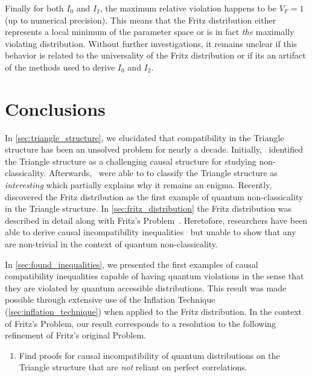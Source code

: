 \documentclass[aps, 10pt, english, twoside, pra, nofootinbib, tightenlines, longbibliography, superscriptaddress]{revtex4-1}
\begin{document}
    Finally for both $I_0$ and $I_2$, the maximum relative violation happens to be $V_F = 1$ (up to numerical precision). This means that the Fritz distribution either represents a local minimum of the parameter space or is in fact \textit{the} maximally violating distribution. Without further investigations, it remains unclear if this behavior is related to the universality of the Fritz distribution or if its an artifact of the methods used to derive $I_0$ and $I_2$.

    \section{Conclusions}
    \label{sec:conclusions}
    In \cref{sec:triangle_structure}, we elucidated that compatibility in the Triangle structure has been an unsolved problem for nearly a decade. Initially,~\citet{Branciard_2012} identified the Triangle structure as a challenging causal structure for studying non-classicality. Afterwards,~\citet{Henson_2014} were able to to classify the Triangle structure as \textit{interesting} which partially explains why it remains an enigma. Recently,~\citet{Fritz_2012} discovered the Fritz distribution as the first example of quantum non-classicality in the Triangle structure. In \cref{sec:fritz_distribution} the Fritz distribution was described in detail along with Fritz's Problem~\cite[Problem 2.17]{Fritz_2012}. Heretofore, researchers have been able to derive causal incompatibility inequalities~\cite{Inflation,Steudel_2010,Henson_2014} but unable to show that any are non-trivial in the context of quantum non-classicality.

    In \cref{sec:found_inequalities}, we presented the first examples of causal compatibility inequalities capable of having quantum violations in the sense that they are violated by quantum accessible distributions. This result was made possible through extensive use of the Inflation Technique (\cref{sec:inflation_technique}) when applied to the Fritz distribution. In the context of Fritz's Problem, our result corresponds to a resolution to the following refinement of Fritz's original Problem.
    \begin{enumerate}[label=\textbf{R.\arabic*}]
        \setcounter{enumi}{0}
        \item \label{r:1} Find proofs for causal incompatibility of quantum distributions on the Triangle structure that are \textit{not} reliant on perfect correlations.
    \end{enumerate}
\end{document}
